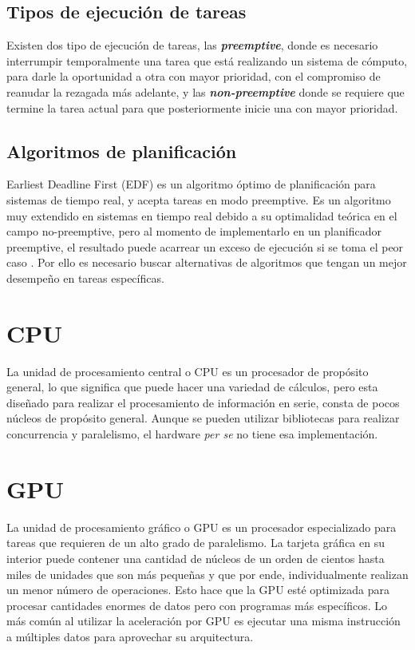     \subsection{Tipos de ejecución de tareas}

    Existen dos tipo de ejecución de tareas, las \textit{\textbf{preemptive}}, donde es necesario interrumpir temporalmente una tarea que está realizando un sistema de cómputo, para darle la oportunidad a otra con mayor prioridad, con el compromiso de reanudar la rezagada más adelante, y las \textit{\textbf{non-preemptive}} donde se requiere que termine la tarea actual para que posteriormente inicie una con mayor prioridad.

    \subsection{Algoritmos de planificación}

    Earliest Deadline First (EDF) es un algoritmo óptimo de planificación para sistemas de tiempo real, y acepta tareas en modo preemptive. Es un algoritmo muy extendido en sistemas en tiempo real debido a su optimalidad teórica en el campo no-preemptive, pero al momento de implementarlo en un planificador preemptive, el resultado puede acarrear un exceso de ejecución si se toma el peor caso \cite{EmbSysDes}. Por ello es necesario buscar alternativas de algoritmos que tengan un mejor desempeño en tareas específicas.

    \section{CPU}
    La unidad de procesamiento central o CPU es un procesador de propósito general, lo que significa que puede hacer una variedad de cálculos, pero esta diseñado para realizar el procesamiento de información en serie, consta de pocos núcleos de propósito general. Aunque se pueden utilizar bibliotecas para realizar concurrencia y paralelismo, el hardware \textit{per se} no tiene esa implementación.

    \section{GPU}
    La unidad de procesamiento gráfico o GPU es un procesador especializado para tareas que requieren de un alto grado de paralelismo. La tarjeta gráfica en su interior puede contener una cantidad de núcleos de un orden de cientos hasta miles de unidades que son más pequeñas y que por ende, individualmente realizan un menor número de operaciones. Esto hace que la GPU esté optimizada para procesar cantidades enormes de datos pero con programas más específicos\cite{gpgpu}. Lo más común al utilizar la aceleración por GPU es ejecutar una misma instrucción a múltiples datos para aprovechar su arquitectura.

